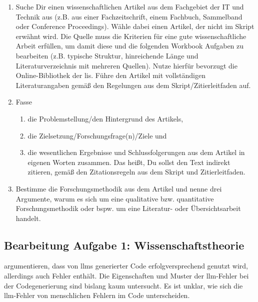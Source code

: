 
\begin{enumerate}[leftmargin=*]
	\itshape
	\item Suche Dir einen wissenschaftlichen Artikel aus dem Fachgebiet der IT und Technik aus (z.B. aus einer Fachzeitschrift, einem Fachbuch, Sammelband oder Conference Proceedings). Wähle dabei einen Artikel, der nicht im Skript erwähnt wird. Die Quelle muss die Kriterien für eine gute wissenschaftliche Arbeit erfüllen, um damit diese und die folgenden Workbook Aufgaben zu bearbeiten (z.B. typische Struktur, hinreichende Länge und Literaturverzeichnis mit mehreren Quellen). Nutze hierfür bevorzugt die Online-Bibliothek der \gls{lis}. Führe den Artikel mit vollständigen Literaturangaben gemäß den Regelungen aus dem Skript/Zitierleitfaden auf.
	\item Fasse
	      \begin{enumerate}[label=\arabic*.]
		      \item die Problemstellung/den Hintergrund des Artikels,
		      \item die Zielsetzung/Forschungsfrage(n)/Ziele und
		      \item die wesentlichen Ergebnisse und Schlussfolgerungen aus dem Artikel in eigenen Worten zusammen. Das heißt, Du sollst den Text indirekt zitieren, gemäß den Zitationsregeln aus dem Skript und Zitierleitfaden.
	      \end{enumerate}
	\item Bestimme die Forschungsmethodik aus dem Artikel und nenne drei Argumente, warum es sich um eine qualitative bzw. quantitative Forschungsmethodik oder bspw. um eine Literatur- oder Übersichtsarbeit handelt.
\end{enumerate}
\upshape

\clearpage

\subsection*{Bearbeitung Aufgabe 1: Wissenschaftstheorie}


\textcite[1-2]{tambon2025} argumentieren, dass von \glspl{llm} generierter Code erfolgversprechend genutzt wird, allerdings auch Fehler enthält. Die Eigenschaften und Muster der \gls{llm}-Fehler bei der Codegenerierung sind bislang kaum untersucht. Es ist unklar, wie sich die \gls{llm}-Fehler von menschlichen Fehlern im Code unterscheiden.

